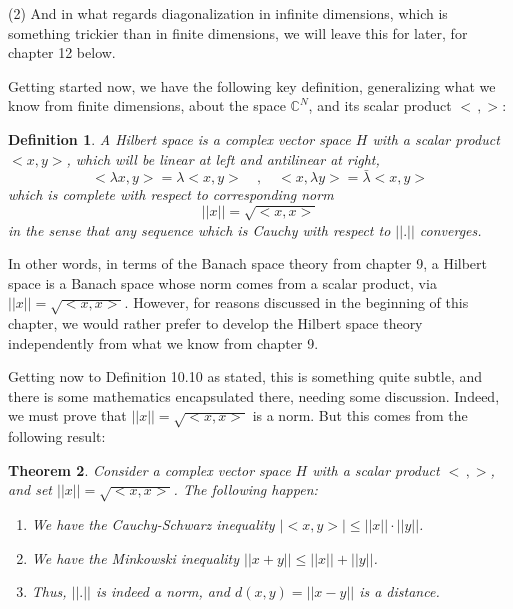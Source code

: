 \documentclass[12pt]{amsbook}
\newtheorem{theorem}{Theorem}[chapter]
\newtheorem{definition}[theorem]{Definition}
\begin{document}
\bigskip

(2) And in what regards diagonalization in infinite dimensions, which is something trickier than in finite dimensions, we will leave this for later, for chapter 12 below.

\bigskip

Getting started now, we have the following key definition, generalizing what we know from finite dimensions, about the space $\mathbb C^N$, and its scalar product $<\,,>$:


\begin{definition}
A Hilbert space is a complex vector space $H$ with a scalar product $<x,y>$, which will be linear at left and antilinear at right,
$$<\lambda x,y>=\lambda<x,y>\quad,\quad <x,\lambda y>=\bar{\lambda}<x,y>$$
which is complete with respect to corresponding norm
$$||x||=\sqrt{<x,x>}$$
in the sense that any sequence which is Cauchy with respect to $||.||$ converges.
\end{definition}

In other words, in terms of the Banach space theory from chapter 9, a Hilbert space is a Banach space whose norm comes from a scalar product, via $||x||=\sqrt{<x,x>}$. However, for reasons discussed in the beginning of this chapter, we would rather prefer to develop the Hilbert space theory independently from what we know from chapter 9.

\bigskip

Getting now to Definition 10.10 as stated, this is something quite subtle, and there is some mathematics encapsulated there, needing some discussion. Indeed, we must prove that $||x||=\sqrt{<x,x>}$ is a norm. But this comes from the following result:


\begin{theorem}
Consider a complex vector space $H$ with a scalar product $<\,,>$, and set $||x||=\sqrt{<x,x>}$. The following happen:
\begin{enumerate}
\item We have the Cauchy-Schwarz inequality $|<x,y>|\leq||x||\cdot||y||$.

\item We have the Minkowski inequality $||x+y||\leq||x||+||y||$.

\item Thus, $||.||$ is indeed a norm, and $d(x,y)=||x-y||$ is a distance.
\end{enumerate}
\end{theorem}
\end{document}
